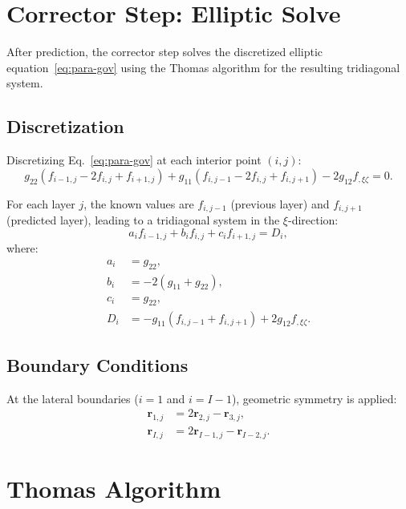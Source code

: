 \documentclass[11pt,a4paper]{report}
\newcommand{\rvec}{\bm{r}}
\begin{document}
\section{Corrector Step: Elliptic Solve}

After prediction, the corrector step solves the discretized elliptic equation~\eqref{eq:para-gov} using the Thomas algorithm for the resulting tridiagonal system.

\subsection{Discretization}

Discretizing Eq.~\eqref{eq:para-gov} at each interior point $(i, j)$:
\begin{equation}
    g_{22}(f_{i-1,j} - 2f_{i,j} + f_{i+1,j}) + g_{11}(f_{i,j-1} - 2f_{i,j} + f_{i,j+1}) - 2g_{12} f_{,\xi\zeta} = 0.
\end{equation}

For each layer $j$, the known values are $f_{i,j-1}$ (previous layer) and $f_{i,j+1}$ (predicted layer), leading to a tridiagonal system in the $\xi$-direction:
\begin{equation}
    a_i f_{i-1,j} + b_i f_{i,j} + c_i f_{i+1,j} = D_i,
\end{equation}
where:
\begin{equation}
\begin{aligned}
    a_i &= g_{22}, \\
    b_i &= -2(g_{11} + g_{22}), \\
    c_i &= g_{22}, \\
    D_i &= -g_{11}(f_{i,j-1} + f_{i,j+1}) + 2g_{12} f_{,\xi\zeta}.
\end{aligned}
\end{equation}

\subsection{Boundary Conditions}

At the lateral boundaries ($i=1$ and $i=I-1$), geometric symmetry is applied:
\begin{equation}
\begin{aligned}
    \rvec_{1,j} &= 2\rvec_{2,j} - \rvec_{3,j}, \\
    \rvec_{I,j} &= 2\rvec_{I-1,j} - \rvec_{I-2,j}.
\end{aligned}
\end{equation}

\section{Thomas Algorithm}
\end{document}
